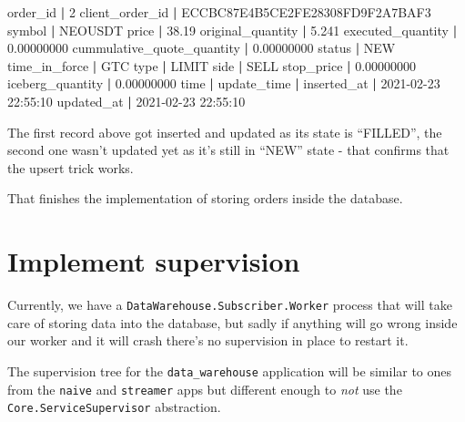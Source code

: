 \documentclass[
  oneside]{book}
\newenvironment{Shaded}{\begin{snugshade}}{\end{snugshade}}
\newcommand{\BuiltInTok}[1]{#1}
\newcommand{\ExtensionTok}[1]{#1}
\newcommand{\KeywordTok}[1]{\textcolor[rgb]{0.13,0.29,0.53}{\textbf{#1}}}
\newcommand{\NormalTok}[1]{#1}
\begin{document}
\begin{Shaded}
\begin{Highlighting}[]
\ExtensionTok{order\_id}                   \KeywordTok{|} \ExtensionTok{2}
\ExtensionTok{client\_order\_id}            \KeywordTok{|} \ExtensionTok{ECCBC87E4B5CE2FE28308FD9F2A7BAF3}
\ExtensionTok{symbol}                     \KeywordTok{|} \ExtensionTok{NEOUSDT}
\ExtensionTok{price}                      \KeywordTok{|} \ExtensionTok{38.19}
\ExtensionTok{original\_quantity}          \KeywordTok{|} \ExtensionTok{5.241}
\ExtensionTok{executed\_quantity}          \KeywordTok{|} \ExtensionTok{0.00000000}
\ExtensionTok{cummulative\_quote\_quantity} \KeywordTok{|} \ExtensionTok{0.00000000}
\ExtensionTok{status}                     \KeywordTok{|} \ExtensionTok{NEW}
\ExtensionTok{time\_in\_force}              \KeywordTok{|} \ExtensionTok{GTC}
\BuiltInTok{type}                       \KeywordTok{|} \ExtensionTok{LIMIT}
\ExtensionTok{side}                       \KeywordTok{|} \ExtensionTok{SELL}
\ExtensionTok{stop\_price}                 \KeywordTok{|} \ExtensionTok{0.00000000}
\ExtensionTok{iceberg\_quantity}           \KeywordTok{|} \ExtensionTok{0.00000000}
\BuiltInTok{time}                       \KeywordTok{|} 
\ExtensionTok{update\_time}                \KeywordTok{|} 
\ExtensionTok{inserted\_at}                \KeywordTok{|} \ExtensionTok{2021{-}02{-}23}\NormalTok{ 22:55:10}
\ExtensionTok{updated\_at}                 \KeywordTok{|} \ExtensionTok{2021{-}02{-}23}\NormalTok{ 22:55:10}
\end{Highlighting}
\end{Shaded}

The first record above got inserted and updated as its state is ``FILLED'', the second one wasn't updated yet as it's still in ``NEW'' state - that confirms that the upsert trick works.

That finishes the implementation of storing orders inside the database.

\hypertarget{implement-supervision}{%
\section{Implement supervision}\label{implement-supervision}}

Currently, we have a \texttt{DataWarehouse.Subscriber.Worker} process that will take care of storing data into the database, but sadly if anything will go wrong inside our worker and it will crash there's no supervision in place to restart it.

The supervision tree for the \texttt{data\_warehouse} application will be similar to ones from the \texttt{naive} and \texttt{streamer} apps but different enough to \emph{not} use the \texttt{Core.ServiceSupervisor} abstraction.
\end{document}
